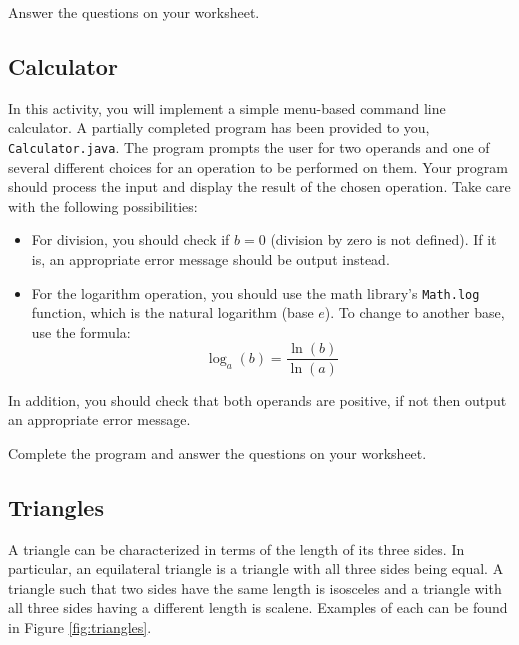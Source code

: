 \documentclass[12pt]{scrartcl}
\begin{document}
Answer the questions on your worksheet.

\subsection{Calculator}

In this activity, you will implement a simple menu-based command line 
calculator.  A partially completed program has been provided to you, 
\texttt{Calculator.java}.  The program prompts the user for two operands 
and one of several different choices for an operation to be performed on 
them.  Your program should process the input and display the result of 
the chosen operation.  Take care with the following possibilities:
\begin{itemize}
  \item For division, you should check if $b = 0$ (division by zero is not defined).  
  	If it is, an appropriate error message should be output instead.
  \item For the logarithm operation, you should use the math library's \texttt{Math.log} 
	function, which is the natural logarithm (base $e$).  To change to another
	 base, use the formula:
	 	$$\log_a{(b)} = \frac{\ln(b)}{\ln(a)}$$
\end{itemize}

In addition, you should check that both operands are positive, if not 
then output an appropriate error message.

Complete the program and answer the questions on your worksheet.

\subsection{Triangles}

A triangle can be characterized in terms of the length of its three sides.  
In particular, an equilateral triangle is a triangle with all three sides being 
equal.  A triangle such that two sides have the same length is isosceles 
and a triangle with all three sides having a different length is scalene.  
Examples of each can be found in Figure \ref{fig:triangles}.
\end{document}
